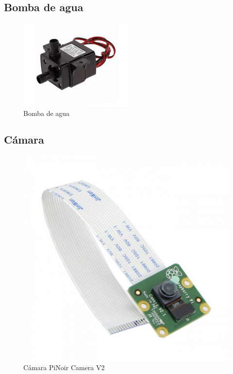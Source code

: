\documentclass[12pt]{article}
\begin{document}
\subsection{Bomba de agua}

\begin{figure}[H]
	\centering
	\includegraphics[scale=1.4]{arduino-bomba-agua}
	\caption{Bomba de agua}
	\label{fig:bomba}
\end{figure}

\subsection{Cámara}

\begin{figure}[H]
	\centering
	\includegraphics[scale=.25]{camera}
	\caption{Cámara PiNoir Camera V2}
	\label{fig:camera}
\end{figure}
\end{document}
